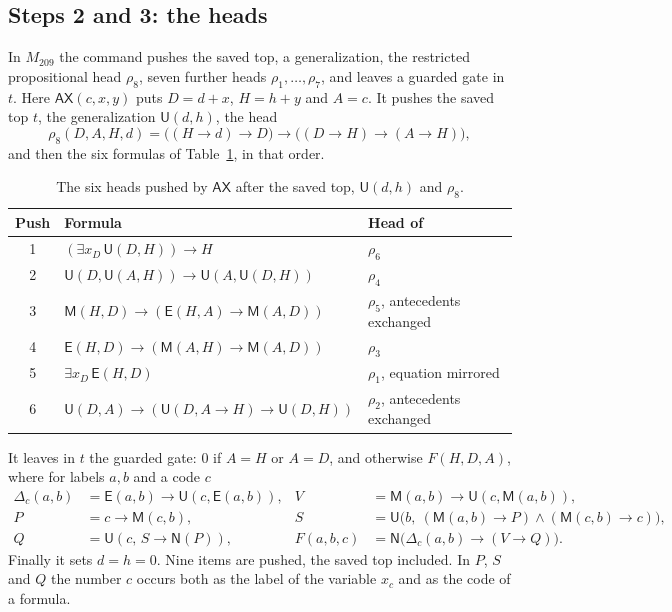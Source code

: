 \documentclass[11pt,letterpaper]{article}
\newcommand{\ax}{\mathsf{AX}}
\newcommand{\Mc}{\mathsf{M}}
\newcommand{\Uc}{\mathsf{U}}
\newcommand{\Ec}{\mathsf{E}}
\newcommand{\Nc}{\mathsf{N}}
\begin{document}
\subsection{Steps 2 and 3: the heads}

In $M_{209}$ the command pushes the saved top, a generalization, the
restricted propositional head $\rho_8$, seven further heads
$\rho_1,\ldots,\rho_7$, and leaves a guarded gate in $t$. Here
$\ax(c,x,y)$ puts $D=d+x$, $H=h+y$ and $A=c$. It pushes the saved top
$t$, the generalization $\Uc(d,h)$, the head
\[
 \rho_8(D,A,H,d)=\bigl((H\to d)\to D\bigr)\to\bigl((D\to H)\to(A\to H)\bigr),
\]
and then the six formulas of Table~\ref{tab:heads}, in that order.

\begin{table}[ht]
\centering\small
\begin{tabular}{@{}cll@{}}
\toprule
Push & Formula & Head of~\cite{pa209} \\
\midrule
1 & $(\exists x_D\,\Uc(D,H))\to H$ & $\rho_6$ \\
2 & $\Uc(D,\Uc(A,H))\to\Uc(A,\Uc(D,H))$ & $\rho_4$ \\
3 & $\Mc(H,D)\to(\Ec(H,A)\to\Mc(A,D))$ & $\rho_5$, antecedents exchanged \\
4 & $\Ec(H,D)\to(\Mc(A,H)\to\Mc(A,D))$ & $\rho_3$ \\
5 & $\exists x_D\,\Ec(H,D)$ & $\rho_1$, equation mirrored \\
6 & $\Uc(D,A)\to(\Uc(D,A\to H)\to\Uc(D,H))$ & $\rho_2$, antecedents exchanged \\
\bottomrule
\end{tabular}
\caption{The six heads pushed by $\ax$ after the saved top,
$\Uc(d,h)$ and $\rho_8$.}\label{tab:heads}
\end{table}

It leaves in $t$ the guarded gate: $0$ if $A=H$ or $A=D$, and
otherwise $F(H,D,A)$, where for labels $a,b$ and a code $c$
\begin{align*}
 \Delta_c(a,b)&=\Ec(a,b)\to\Uc(c,\Ec(a,b)), &
 V&=\Mc(a,b)\to\Uc(c,\Mc(a,b)),\\
 P&=c\to\Mc(c,b), &
 S&=\Uc\bigl(b,\ (\Mc(a,b)\to P)\wedge(\Mc(c,b)\to c)\bigr),\\
 Q&=\Uc(c,\,S\to\Nc(P)), &
 F(a,b,c)&=\Nc\bigl(\Delta_c(a,b)\to(V\to Q)\bigr).
\end{align*}
Finally it sets $d=h=0$. Nine items are pushed, the saved top
included. In $P$, $S$ and $Q$ the number $c$ occurs both as the label
of the variable $x_c$ and as the code of a formula.
\end{document}
